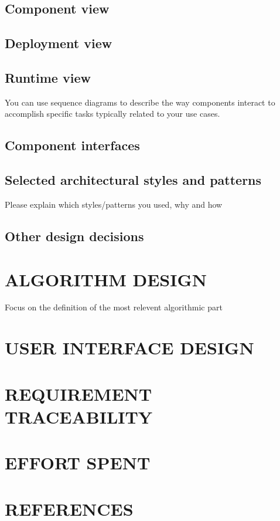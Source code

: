 \documentclass{article}
\begin{document}
	\subsection{Component view}
	\subsection{Deployment view}
	\subsection{Runtime view}
	You can use sequence diagrams to describe the way components interact to accomplish specific tasks typically related to your use cases.
	\subsection{Component interfaces}
	\subsection{Selected architectural styles and patterns}
	Please explain which styles/patterns you used, why and how
	\subsection{Other design decisions}
	\newpage
	\section{ALGORITHM DESIGN}
	Focus on the definition of the most relevent algorithmic part
	\newpage
	\section{USER INTERFACE DESIGN}
	\newpage
	\section{REQUIREMENT TRACEABILITY}
	\newpage
	\section{EFFORT SPENT}
	\newpage
	\section{REFERENCES}
\end{document}
